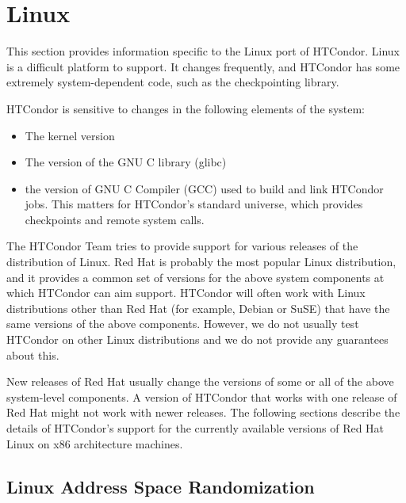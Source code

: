 \section{\label{sec:platform-linux}Linux}

This section provides information specific to the Linux port of
HTCondor.
Linux is a difficult platform to support.
It changes frequently, and HTCondor has some extremely
system-dependent code, such as the checkpointing library.

HTCondor is sensitive to changes in the following elements of the
system: 
\begin{itemize}
\item The kernel version
\item The version of the GNU C library (glibc)
\item the version of GNU C Compiler (GCC) used to build and link
  HTCondor jobs. This matters for HTCondor's standard universe, which
  provides checkpoints and remote system calls.
\end{itemize}

The HTCondor Team tries to provide support for various releases of the
distribution of Linux.
Red Hat is probably the most popular Linux distribution, and it
provides a common set of versions for the above system components
at which HTCondor can aim support.
HTCondor will often work with Linux distributions other than Red Hat (for
example, Debian or SuSE) that have the same versions of the above
components.
However, we do not usually test HTCondor on other Linux distributions
and we do not provide any guarantees about this.

New releases of Red Hat usually change the versions of some or all of
the above system-level components.
A version of HTCondor that works with one release of Red Hat might not
work with newer releases.
The following sections describe the details of HTCondor's support for
the currently available versions of Red Hat Linux on x86 architecture
machines.

\subsection{\label{sec:platform-linux-addrspace-random}Linux Address Space Randomization}

